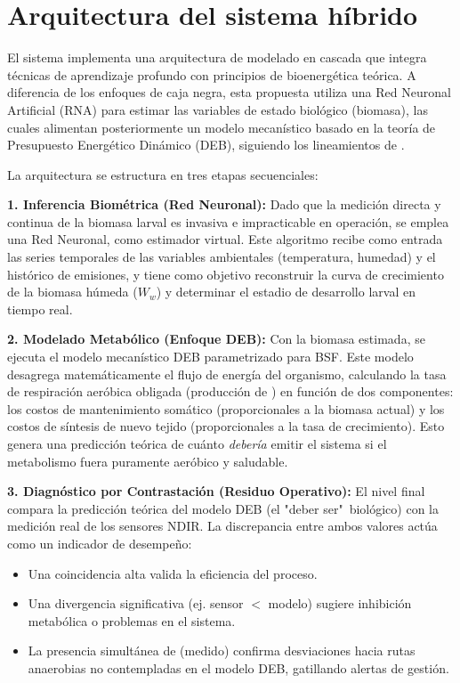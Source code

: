 \section{Arquitectura del sistema híbrido}

El sistema implementa una arquitectura de modelado en cascada que integra técnicas de aprendizaje profundo con principios de bioenergética teórica. A diferencia de los enfoques de caja negra, esta propuesta utiliza una Red Neuronal Artificial (RNA) para estimar las variables de estado biológico (biomasa), las cuales alimentan posteriormente un modelo mecanístico basado en la teoría de Presupuesto Energético Dinámico (DEB), siguiendo los lineamientos de \textcite{eriksenDynamicModellingFeed2022}. 

La arquitectura se estructura en tres etapas secuenciales:

\textbf{1. Inferencia Biométrica (Red Neuronal):} Dado que la medición directa y continua de la biomasa larval es invasiva e impracticable en operación, se emplea una Red Neuronal, como estimador virtual. Este algoritmo recibe como entrada las series temporales de las variables ambientales (temperatura, humedad) y el histórico de emisiones, y tiene como objetivo reconstruir la curva de crecimiento de la biomasa húmeda ($W_w$) y determinar el estadio de desarrollo larval en tiempo real.

\textbf{2. Modelado Metabólico (Enfoque DEB):} Con la biomasa estimada, se ejecuta el modelo mecanístico DEB parametrizado para BSF. Este modelo desagrega matemáticamente el flujo de energía del organismo, calculando la tasa de respiración aeróbica obligada (producción de ) en función de dos componentes: los costos de mantenimiento somático (proporcionales a la biomasa actual) y los costos de síntesis de nuevo tejido (proporcionales a la tasa de crecimiento). Esto genera una predicción teórica de cuánto  \textit{debería} emitir el sistema si el metabolismo fuera puramente aeróbico y saludable.

\textbf{3. Diagnóstico por Contrastación (Residuo Operativo):} El nivel final compara la predicción teórica del modelo DEB (el "deber ser"\ biológico) con la medición real de los sensores NDIR. La discrepancia entre ambos valores actúa como un indicador de desempeño:\begin{itemize}\item Una coincidencia alta valida la eficiencia del proceso.\item Una divergencia significativa (ej. sensor $<$ modelo) sugiere inhibición metabólica o problemas en el sistema.\item La presencia simultánea de  (medido) confirma desviaciones hacia rutas anaerobias no contempladas en el modelo DEB, gatillando alertas de gestión.\end{itemize}


